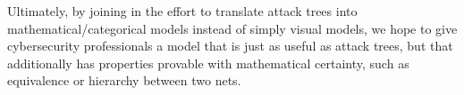 \par Ultimately, by joining in the effort to translate attack trees into mathematical/categorical models instead of simply visual models, we hope to give cybersecurity professionals a model that is just as useful as attack trees, but that additionally has properties provable with mathematical certainty, such as equivalence or hierarchy between two nets.